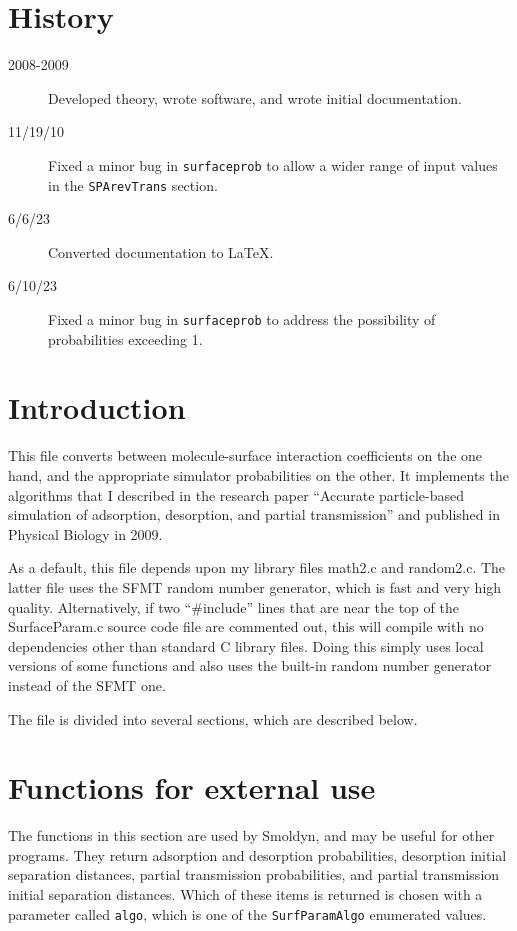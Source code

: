 \documentclass[11pt]{article}
\newcommand {\ttt} {\texttt}
\begin{document}
\section{History}
\begin{description}
\item[2008-2009] Developed theory, wrote software, and wrote initial documentation.
\item[11/19/10] Fixed a minor bug in \ttt{surfaceprob} to allow a wider range of input values in the \ttt{SPArevTrans} section.
\item[6/6/23] Converted documentation to LaTeX.
\item[6/10/23] Fixed a minor bug in \ttt{surfaceprob} to address the possibility of probabilities exceeding 1.

\end{description}


\section{Introduction}

This file converts between molecule-surface interaction coefficients on the one hand, and the appropriate simulator probabilities on the other. It implements the algorithms that I described in the research paper ``Accurate particle-based simulation of adsorption, desorption, and partial transmission'' and published in Physical Biology in 2009.

As a default, this file depends upon my library files math2.c and random2.c. The latter file uses the SFMT random number generator, which is fast and very high quality. Alternatively, if two ``\#include'' lines that are near the top of the SurfaceParam.c source code file are commented out, this will compile with no dependencies other than standard C library files. Doing this simply uses local versions of some functions and also uses the built-in random number generator instead of the SFMT one.

The file is divided into several sections, which are described below.

\section{Functions for external use}

The functions in this section are used by Smoldyn, and may be useful for other programs. They return adsorption and desorption probabilities, desorption initial separation distances, partial transmission probabilities, and partial transmission initial separation distances. Which of these items is returned is chosen with a parameter called \ttt{algo}, which is one of the \ttt{SurfParamAlgo} enumerated values.
\end{document}
